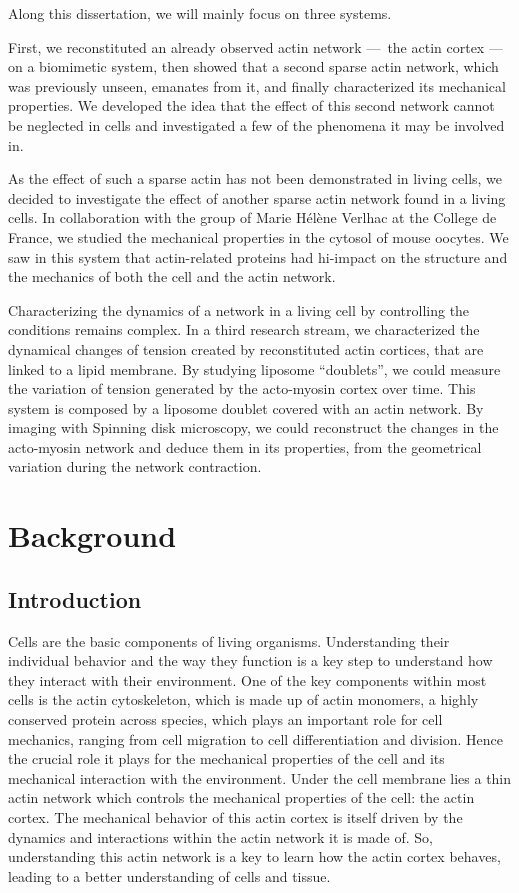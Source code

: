 \documentclass[A4paperpaper,11pt,english]{sphinxmanual}
\begin{document}
Along this dissertation, we will mainly focus on three systems.

First, we reconstituted an already observed actin network — the actin
cortex — on a biomimetic system, then showed that a
second sparse actin network, which was previously unseen, emanates from it, and finally characterized its mechanical
properties. We developed the idea that the effect of this second network cannot
be neglected in cells and investigated a few of the phenomena it may be involved
in.

As the effect of such a sparse actin has not been demonstrated in living cells, we decided to
investigate the effect of another sparse actin network found in a living cells. In
collaboration with the group of Marie Hélène Verlhac at the College de France, we studied the mechanical properties
in the cytosol of mouse oocytes. We saw in this system that actin-related proteins had
hi-impact on the structure and the mechanics of both the cell and the actin
network.

Characterizing the dynamics of a network in a living cell by controlling the
conditions remains complex.  In a third research stream, we characterized the dynamical changes of tension created by reconstituted actin
cortices, that are linked to a lipid
membrane. By studying liposome ``doublets'', we could measure the variation of tension generated by the acto-myosin cortex over
time. This system is composed by a liposome doublet covered with
an actin network. By imaging with Spinning disk microscopy, we could
reconstruct the changes in the acto-myosin network and deduce them in its
properties, from the geometrical variation during the network contraction.


\chapter{Background}
\label{parts/part1:background}

\section{Introduction}
\label{parts/part1:introduction}
Cells are the basic components of living organisms. Understanding their
individual behavior and the way they function is a key step to understand
how they interact with their environment. One of the key components within most
cells is the actin cytoskeleton, which is made up of actin monomers, a highly conserved protein across species, which plays
an important role for cell mechanics, ranging from cell migration to cell differentiation
and division. Hence the crucial role it plays for the mechanical properties of
the cell and its mechanical interaction with the environment. Under the cell membrane lies a
thin actin network which controls the mechanical properties of the cell:
the actin cortex. The mechanical behavior of this actin cortex is itself driven
by the dynamics and interactions within the actin network it is made of.
So, understanding this actin network is a key to learn how the actin
cortex behaves, leading to a better understanding of cells and tissue.
\end{document}
